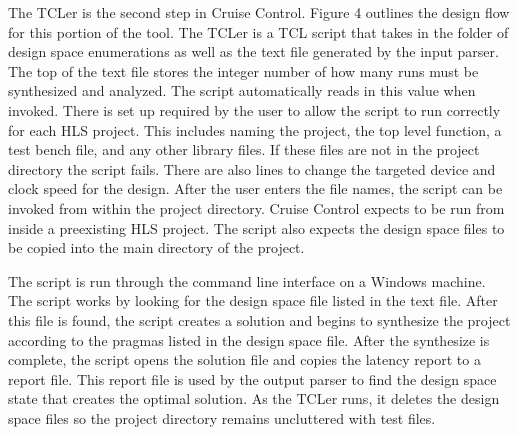 \documentclass[letterpaper, 10 pt, conference]{IEEEconf}  %
\begin{document}
The TCLer is the second step in Cruise Control. Figure 4 outlines the design flow for this portion of the tool. The TCLer is a TCL script that takes in the folder of design space enumerations as well as the text file generated by the input parser. The top of the text file stores the integer number of how many runs must be synthesized and analyzed. The script automatically reads in this value when invoked. There is set up required by the user to allow the script to run correctly for each HLS project. This includes naming the project, the top level function, a test bench file, and any other library files. If these files are not in the project directory the script fails. There are also lines to change the targeted device and clock speed for the design. After the user enters the file names, the script can be invoked from within the project directory. Cruise Control expects to be run from inside a preexisting HLS project.  The script also expects the design space files to be copied into the main directory of the project. \newline

The script is run through the command line interface on a Windows machine. The script works by looking for the design space file listed in the text file. After this file is found, the script creates a solution and begins to synthesize the project according to the pragmas listed in the design space file. After the synthesize is complete, the script opens the solution file and copies the latency report to a report file. This report file is used by the output parser to find the design space state that creates the optimal solution. As the TCLer runs, it deletes the design space files so the project directory remains uncluttered with test files. 
\end{document}

